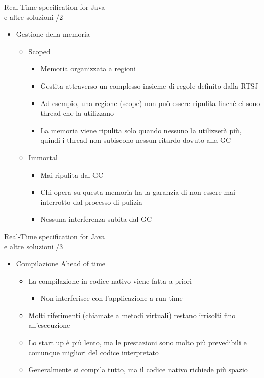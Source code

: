 \begin{frame}{Real-Time specification for Java \\e altre soluzioni /2}
	\begin{itemize}
		\item Gestione della memoria
		\begin{itemize}
			\item Scoped
			\begin{itemize}
				\item Memoria organizzata a regioni
				\item Gestita attraverso un complesso insieme di regole definito dalla RTSJ
				\item Ad esempio, una regione (scope) non può essere ripulita finché ci sono thread che la utilizzano
				\item La memoria viene ripulita solo quando nessuno la utilizzerà più, quindi i thread non subiscono nessun ritardo dovuto alla GC
			\end{itemize}
			\item Immortal
			\begin{itemize}
				\item Mai ripulita dal GC
				\item Chi opera su questa memoria ha la garanzia di non essere mai interrotto dal processo di pulizia
				\item Nessuna interferenza subita dal GC
			\end{itemize}
		\end{itemize}
	\end{itemize}
\end{frame}
\begin{frame}{Real-Time specification for Java \\e altre soluzioni /3}
	\begin{itemize}
		\item Compilazione Ahead of time
		\begin{itemize}
			\item La compilazione in codice nativo viene fatta a priori
			\begin{itemize}
				\item Non interferisce con l'applicazione a run-time
			\end{itemize}
			\item Molti riferimenti (chiamate a metodi virtuali) restano irrisolti fino all'esecuzione
			\item Lo start up è più lento, ma le prestazioni sono molto più prevedibili e comunque migliori del codice interpretato
			\item Generalmente si compila tutto, ma il codice nativo richiede più spazio
		\end{itemize}
	\end{itemize}
\end{frame}